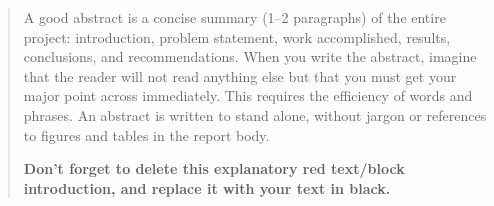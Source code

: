 \begin{abstract} %

\begin{tcolorbox}[      %
    boxrule=0pt,        %
    colback=white,      %
    coltext=red         %
]                       %
    A good abstract is a concise summary (1--2 paragraphs) of the entire project: introduction, problem statement, work accomplished, results, conclusions, and recommendations. When you write the abstract, imagine that the reader will not read anything else but that you must get your major point across immediately. This requires the efficiency of words and phrases. An abstract is written to stand alone, without jargon or references to figures and tables in the report body.
    
    \vspace{15pt}           %
    \begin{center}          %
    \textbf{Don't forget to delete this explanatory red text/block introduction, and replace it with your text in black.}
    \end{center}            %
\end{tcolorbox}
\end{abstract}
